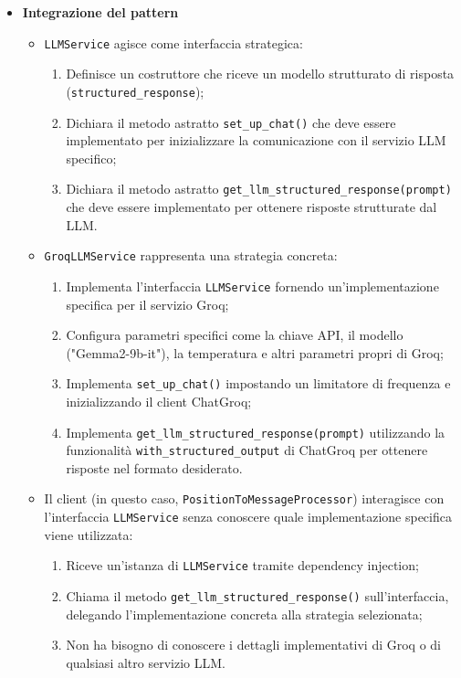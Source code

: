 \documentclass[10pt]{article}
\begin{document}
\begin{itemize}
    \item \textbf{Integrazione del pattern}
    \begin{itemize}
        \item \texttt{LLMService} agisce come interfaccia strategica:
        \begin{enumerate}
            \item Definisce un costruttore che riceve un modello strutturato di risposta (\texttt{structured\_response});
            \item Dichiara il metodo astratto \texttt{set\_up\_chat()} che deve essere implementato per inizializzare la comunicazione con il servizio LLM specifico;
            \item Dichiara il metodo astratto \texttt{get\_llm\_structured\_response(prompt)} che deve essere implementato per ottenere risposte strutturate dal LLM.
        \end{enumerate}
        
        \item \texttt{GroqLLMService} rappresenta una strategia concreta:
        \begin{enumerate}
            \item Implementa l'interfaccia \texttt{LLMService} fornendo un'implementazione specifica per il servizio Groq;
            \item Configura parametri specifici come la chiave API, il modello ("Gemma2-9b-it"), la temperatura e altri parametri propri di Groq;
            \item Implementa \texttt{set\_up\_chat()} impostando un limitatore di frequenza e inizializzando il client ChatGroq;
            \item Implementa \texttt{get\_llm\_structured\_response(prompt)} utilizzando la funzionalità \texttt{with\_structured\_output} di ChatGroq per ottenere risposte nel formato desiderato.
        \end{enumerate}
        
        \item Il client (in questo caso, \texttt{PositionToMessageProcessor}) interagisce con l'interfaccia \texttt{LLMService} senza conoscere quale implementazione specifica viene utilizzata:
        \begin{enumerate}
            \item Riceve un'istanza di \texttt{LLMService} tramite dependency injection;
            \item Chiama il metodo \texttt{get\_llm\_structured\_response()} sull'interfaccia, delegando l'implementazione concreta alla strategia selezionata;
            \item Non ha bisogno di conoscere i dettagli implementativi di Groq o di qualsiasi altro servizio LLM.
        \end{enumerate}
        

\end{itemize}
\end{itemize}
\end{document}
